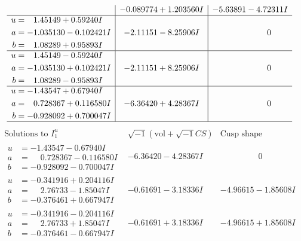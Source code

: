 \documentclass[1p]{elsarticle_modified}
\theoremstyle{definition}
\newcommand{\I}{\sqrt{-1}}
\begin{document}
$$\begin{array}{c|c|c}
 & -0.089774 + 1.203560 I & -5.63891 - 4.72311 I \\ \hline\begin{aligned}
u &= \phantom{-}1.45149 + 0.59240 I \\
a &= -1.035130 - 0.102421 I \\
b &= \phantom{-}1.08289 + 0.95893 I\end{aligned}
 & -2.11151 - 8.25906 I & \phantom{-0.000000 } 0 \\ \hline\begin{aligned}
u &= \phantom{-}1.45149 - 0.59240 I \\
a &= -1.035130 + 0.102421 I \\
b &= \phantom{-}1.08289 - 0.95893 I\end{aligned}
 & -2.11151 + 8.25906 I & \phantom{-0.000000 } 0 \\ \hline\begin{aligned}
u &= -1.43547 + 0.67940 I \\
a &= \phantom{-}0.728367 + 0.116580 I \\
b &= -0.928092 + 0.700047 I\end{aligned}
 & -6.36420 + 4.28367 I & \phantom{-0.000000 } 0\\
 \hline 
 \end{array}$$\newpage$$\begin{array}{c|c|c}  
\text{Solutions to }I^u_{1}& \I (\text{vol} + \sqrt{-1}CS) & \text{Cusp shape}\\
 \hline 
\begin{aligned}
u &= -1.43547 - 0.67940 I \\
a &= \phantom{-}0.728367 - 0.116580 I \\
b &= -0.928092 - 0.700047 I\end{aligned}
 & -6.36420 - 4.28367 I & \phantom{-0.000000 } 0 \\ \hline\begin{aligned}
u &= -0.341916 + 0.204116 I \\
a &= \phantom{-}2.76733 - 1.85047 I \\
b &= -0.376461 + 0.667947 I\end{aligned}
 & -0.61691 - 3.18336 I & -4.96615 - 1.85608 I \\ \hline\begin{aligned}
u &= -0.341916 - 0.204116 I \\
a &= \phantom{-}2.76733 + 1.85047 I \\
b &= -0.376461 - 0.667947 I\end{aligned}
 & -0.61691 + 3.18336 I & -4.96615 + 1.85608 I \\ \hline\begin{aligned}

\end{aligned}
\end{array}$$
\end{document}
